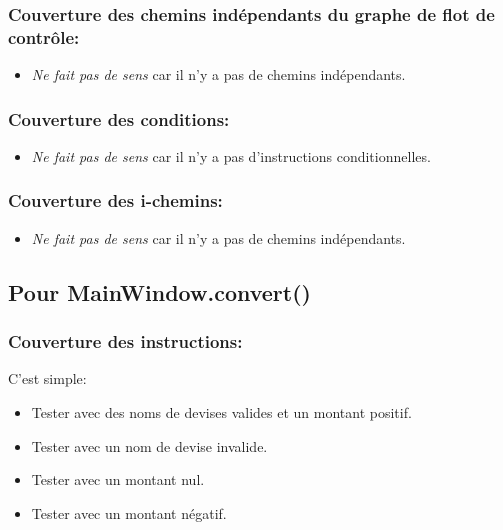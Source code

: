 \documentclass{article}
\begin{document}
\subsubsection{Couverture des chemins indépendants du graphe de flot de contrôle:}
\begin{itemize}
    \item \textit{Ne fait pas de sens} car il n'y a pas de chemins indépendants.
\end{itemize}

\subsubsection{Couverture des conditions:}
\begin{itemize}
    \item \textit{Ne fait pas de sens} car il n'y a pas d'instructions conditionnelles.
\end{itemize}

\subsubsection{Couverture des i-chemins:}
\begin{itemize}
    \item \textit{Ne fait pas de sens} car il n'y a pas de chemins indépendants.
\end{itemize}

\subsection{Pour MainWindow.convert()}
\subsubsection{Couverture des instructions:}
C'est simple:
\begin{itemize}
    \item Tester avec des noms de devises valides et un montant positif.
    \item Tester avec un nom de devise invalide.
    \item Tester avec un montant nul.
    \item Tester avec un montant négatif.
\end{itemize}
\end{document}
